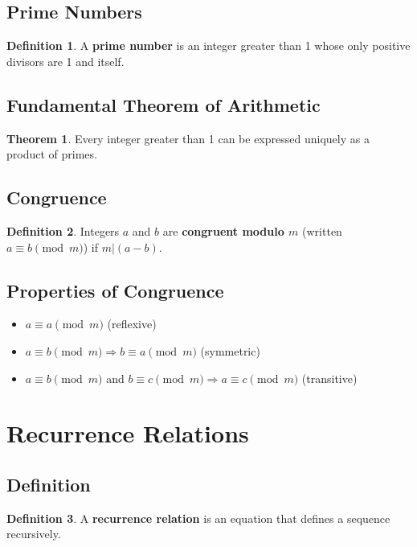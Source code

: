 \documentclass[11pt]{article}
\theoremstyle{definition}
\newtheorem{definition}{Definition}[section]
\newtheorem{theorem}{Theorem}[section]
\begin{document}
\subsection{Prime Numbers}
\begin{definition}
A \textbf{prime number} is an integer greater than 1 whose only positive divisors are 1 and itself.
\end{definition}

\subsection{Fundamental Theorem of Arithmetic}
\begin{theorem}
Every integer greater than 1 can be expressed uniquely as a product of primes.
\end{theorem}

\subsection{Congruence}
\begin{definition}
Integers $a$ and $b$ are \textbf{congruent modulo $m$} (written $a \equiv b \pmod{m}$) if $m | (a - b)$.
\end{definition}

\subsection{Properties of Congruence}
\begin{itemize}
    \item $a \equiv a \pmod{m}$ (reflexive)
    \item $a \equiv b \pmod{m} \Rightarrow b \equiv a \pmod{m}$ (symmetric)
    \item $a \equiv b \pmod{m}$ and $b \equiv c \pmod{m} \Rightarrow a \equiv c \pmod{m}$ (transitive)
\end{itemize}

\section{Recurrence Relations}

\subsection{Definition}
\begin{definition}
A \textbf{recurrence relation} is an equation that defines a sequence recursively.
\end{definition}
\end{document}
